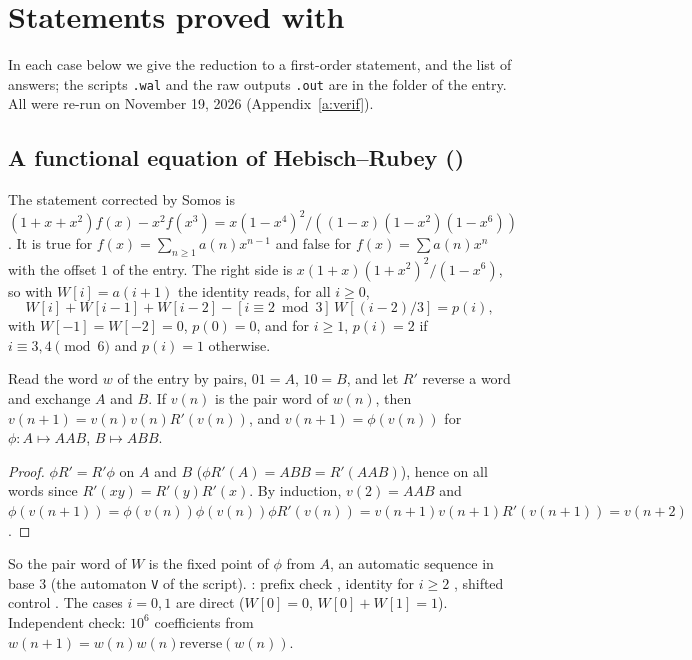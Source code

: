 \section{Statements proved with \Walnut}\label{s:walnut}
In each case below we give the reduction to a first-order statement, and the list of \Walnut{} answers; the
scripts \texttt{.wal} and the raw outputs \texttt{.out} are in the folder of the entry. All were re-run on
November 19, 2026 (Appendix~\ref{a:verif}).

\subsection{A functional equation of Hebisch--Rubey ()}\label{s:A118006}
The statement corrected by Somos is $(1+x+x^2)f(x)-x^2f(x^3)=x(1-x^4)^2/((1-x)(1-x^2)(1-x^6))$. It is true for
$f(x)=\sum_{n\ge1}a(n)x^{n-1}$ and false for $f(x)=\sum a(n)x^n$ with the offset $1$ of the entry. The right side
is $x(1+x)(1+x^2)^2/(1-x^6)$, so with $W[i]=a(i+1)$ the identity reads, for all $i\ge0$,
\[ W[i]+W[i-1]+W[i-2]-[i\equiv2\bmod3]\,W[(i-2)/3]=p(i), \]
with $W[-1]=W[-2]=0$, $p(0)=0$, and for $i\ge1$, $p(i)=2$ if $i\equiv3,4\pmod6$ and $p(i)=1$ otherwise.
\begin{lemma} Read the word $w$ of the entry by pairs, $01=A$, $10=B$, and let $R'$ reverse a word and exchange
$A$ and $B$. If $v(n)$ is the pair word of $w(n)$, then $v(n+1)=v(n)v(n)R'(v(n))$, and $v(n+1)=\phi(v(n))$ for
$\phi:A\mapsto AAB$, $B\mapsto ABB$.\end{lemma}
\begin{proof} $\phi R'=R'\phi$ on $A$ and $B$ ($\phi R'(A)=ABB=R'(AAB)$), hence on all words since
$R'(xy)=R'(y)R'(x)$. By induction, $v(2)=AAB$ and
$\phi(v(n+1))=\phi(v(n))\phi(v(n))\phi R'(v(n))=v(n+1)v(n+1)R'(v(n+1))=v(n+2)$. \end{proof}
So the pair word of $W$ is the fixed point of $\phi$ from $A$, an automatic sequence in base $3$ (the
automaton \texttt{V} of the script). \Walnut: prefix check \TRUE, identity for $i\ge2$ \TRUE, shifted control
\FALSE. The cases $i=0,1$ are direct ($W[0]=0$, $W[0]+W[1]=1$). Independent check: $10^6$ coefficients from
$w(n+1)=w(n)w(n)\mathrm{reverse}(w(n))$.

